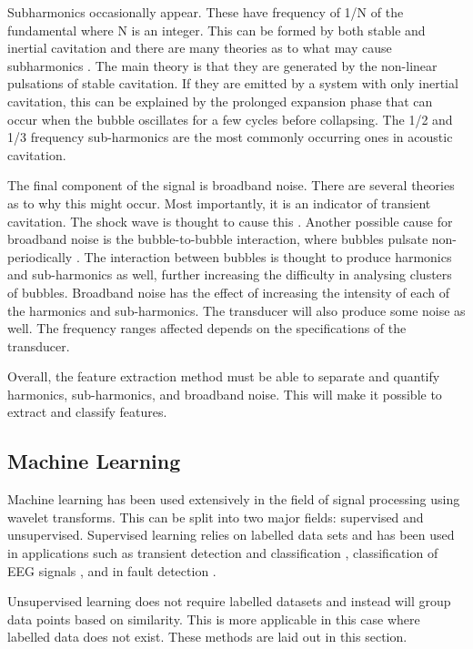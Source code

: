 \documentclass[reprint,NumberedRefs]{JASA}
\begin{document}
Subharmonics occasionally appear. These have frequency of 1/N of the fundamental where N is an integer. This can be formed by both stable and inertial cavitation and there are many theories as to what may cause subharmonics \cite{Leighton1994}. The main theory is that they are generated by the non-linear pulsations of stable cavitation. If they are emitted by a system with only inertial cavitation, this can be explained by the prolonged expansion phase that can occur when the bubble oscillates for a few cycles before collapsing. The 1/2 and 1/3 frequency sub-harmonics are the most commonly occurring ones in acoustic cavitation.

The final component of the signal is broadband noise. There are several theories as to why this might occur. Most importantly, it is an indicator of transient cavitation. The shock wave is thought to cause this \cite{frohly2000ultrasonic}. Another possible cause for broadband noise is the bubble-to-bubble interaction, where bubbles pulsate non-periodically \cite{yasui2010numerical}. The interaction between bubbles is thought to produce harmonics and sub-harmonics as well, further increasing the difficulty in analysing clusters of bubbles. Broadband noise has the effect of increasing the intensity of each of the harmonics and sub-harmonics. The transducer will also produce some noise as well. The frequency ranges affected depends on the specifications of the transducer.

Overall, the feature extraction method must be able to separate and quantify harmonics, sub-harmonics, and broadband noise. This will make it possible to extract and classify features.

\subsection{Machine Learning}
Machine learning has been used extensively in the field of signal processing using wavelet transforms. This can be split into two major fields: supervised and unsupervised. Supervised learning relies on labelled data sets and has been used in applications such as transient detection and classification \cite{963220}, classification of EEG signals \cite{desai2020eeg}, and in fault detection \cite{rafiee2007intelligent}.

Unsupervised learning does not require labelled datasets and instead will group data points based on similarity. This is more applicable in this case where labelled data does not exist. These methods are laid out in this section.
\end{document}

